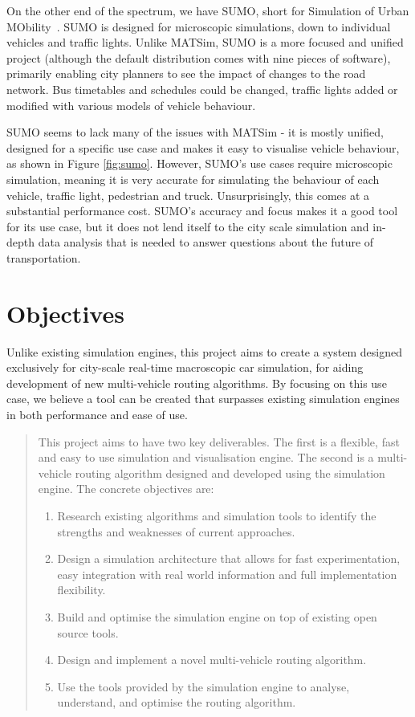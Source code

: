 \documentclass[ %
                    author={Alexander Hill},
                supervisor={Dr. Benjamin Sach},
                    degree={MEng},
                     title={MARMOSET},
                  subtitle={Multi-Agent Route Management using Online Simulation for Efficient Transportation},
                      type={research},
                      year={2016} ]{dissertation}
\begin{document}
On the other end of the spectrum, we have SUMO, short for Simulation of Urban
MObility~\cite{sumo}. SUMO is designed for microscopic simulations, down to
individual vehicles and traffic lights. Unlike MATSim, SUMO is a more focused
and unified project (although the default distribution comes with nine pieces of
software), primarily enabling city planners to see the impact of changes to the
road network. Bus timetables and schedules could be changed, traffic lights
added or modified with various models of vehicle behaviour.

SUMO seems to lack many of the issues with MATSim - it is mostly unified,
designed for a specific use case and makes it easy to visualise vehicle
behaviour, as shown in Figure \ref{fig:sumo}. However, SUMO's use cases require
microscopic simulation, meaning it is very accurate for simulating the behaviour
of each vehicle, traffic light, pedestrian and truck. Unsurprisingly, this comes
at a substantial performance cost. SUMO's accuracy and focus makes it a good
tool for its use case, but it does not lend itself to the city scale simulation
and in-depth data analysis that is needed to answer questions about the future
of transportation.

\section{Objectives}

Unlike existing simulation engines, this project aims to create a system
designed exclusively for city-scale real-time macroscopic car simulation, for
aiding development of new multi-vehicle routing algorithms. By focusing on this
use case, we believe a tool can be created that surpasses existing simulation
engines in both performance and ease of use.

\begin{quote}
\noindent
This project aims to have two key deliverables. The first is a flexible, fast
and easy to use simulation and visualisation engine. The second is a
multi-vehicle routing algorithm designed and developed using the simulation
engine. The concrete objectives are:

\begin{enumerate}
    \item Research existing algorithms and simulation tools to identify the
            strengths and weaknesses of current approaches.
    \item Design a simulation architecture that allows for fast experimentation,
        easy integration with real world information and full implementation
        flexibility.
    \item Build and optimise the simulation engine on top of existing open
        source tools.
    \item Design and implement a novel multi-vehicle routing algorithm.
    \item Use the tools provided by the simulation engine to analyse,
        understand, and optimise the routing algorithm.
\end{enumerate}

\end{quote}
\end{document}

